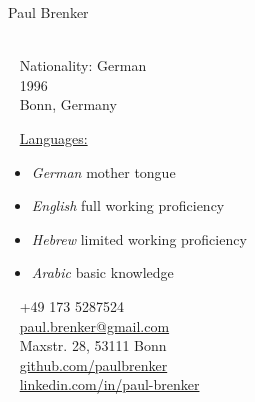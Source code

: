 \documentclass{modernsimplecv}
\begin{document}
\begin{minipage}[t]{0.77\textwidth}
\vspace{0pt} %
\begin{shaded*}

\begin{minipage}[t]{0.4\textwidth}
\vspace{0pt} %
{\par\centering\huge{Paul Brenker}} \\[0.3cm]
\faGlobe~ Nationality: German\\
\faBirthdayCake~ 1996 \\
\faMapMarker~ Bonn, Germany \\
\begin{spacing}{0.5}
{\small
\faCommentsO~ \underline{Languages:} 

  \begin{itemize}
    \item \emph{German} mother tongue
    \item \emph{English} full working proficiency
    \item \emph{Hebrew} limited working proficiency
    \item \emph{Arabic} basic knowledge
  \end{itemize}
}
\end{spacing}
\vspace{4pt} %
\end{minipage}\hfill
\begin{minipage}[t]{0.55\textwidth}
\vspace{0pt} %
\faPhone~ +49 173 5287524 \\
\faAt~ \protect\url{paul.brenker@gmail.com} \\

\faEnvelopeO~ Maxstr. 28, 53111 Bonn \\ 

\faGithub~ \protect\url{github.com/paulbrenker} \\
\faLinkedin~ \protect\url{linkedin.com/in/paul-brenker} \\
\end{minipage}
\hfill
\end{shaded*}
\end{minipage}\\[15pt]


\end{document}
